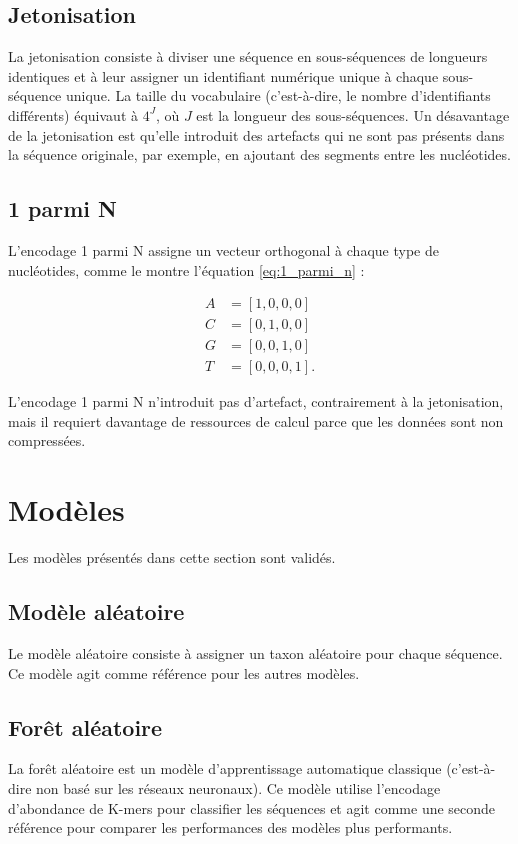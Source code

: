 \subsection{Jetonisation}
La jetonisation consiste à diviser une séquence en sous-séquences de longueurs identiques et à leur
assigner un identifiant numérique unique à chaque sous-séquence unique. La taille du vocabulaire
(c'est-à-dire, le nombre d'identifiants différents) équivaut à $4^J$, où $J$ est la longueur des
sous-séquences. Un désavantage de la jetonisation est qu'elle introduit des artefacts qui ne sont
pas présents dans la séquence originale, par exemple, en ajoutant des segments entre les
nucléotides.

\subsection{1 parmi N}
L'encodage 1 parmi N assigne un vecteur orthogonal à chaque type de nucléotides, comme le montre
l'équation \ref{eq:1_parmi_n} :

\begin{equation}
    \label{eq:1_parmi_n}
    \begin{split}
        A &= [1, 0, 0, 0] \\
        C &= [0, 1, 0, 0] \\
        G &= [0, 0, 1, 0] \\
        T &= [0, 0, 0, 1].
    \end{split}
\end{equation}

L'encodage 1 parmi N n'introduit pas d'artefact, contrairement à la jetonisation, mais il requiert
davantage de ressources de calcul parce que les données sont non compressées.

\section{Modèles}
Les modèles présentés dans cette section sont validés.

\subsection{Modèle aléatoire}
Le modèle aléatoire consiste à assigner un taxon aléatoire pour chaque séquence. Ce modèle agit
comme référence pour les autres modèles.

\subsection{Forêt aléatoire}
La forêt aléatoire \cite{breiman2001} est un modèle d'apprentissage automatique classique
(c'est-à-dire non basé sur les réseaux neuronaux). Ce modèle utilise l'encodage d'abondance de
K-mers pour classifier les séquences et agit comme une seconde référence pour comparer les
performances des modèles plus performants.

